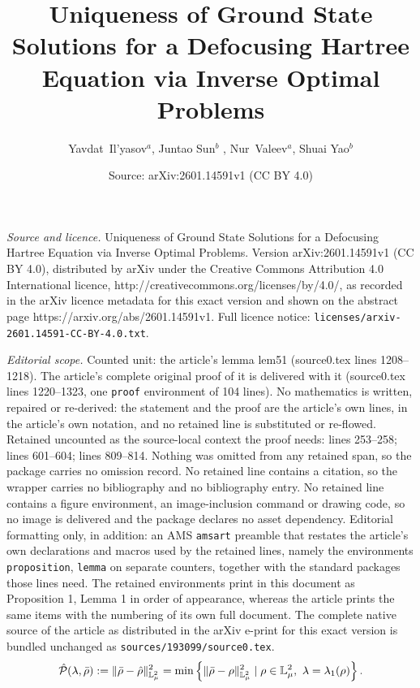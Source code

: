 \documentclass[10pt,a4paper]{amsart}
\title{Uniqueness of Ground State Solutions for a Defocusing Hartree Equation via Inverse Optimal Problems}
\author{Yavdat~Il'yasov$^{a}$, Juntao Sun$^{b}$ , Nur~Valeev$^{a}$, Shuai Yao$^{b}$}
\date{Source: arXiv:2601.14591v1 (CC BY 4.0)}
\begin{document}
\maketitle

\noindent\emph{Source and licence.} Uniqueness of Ground State Solutions for a Defocusing Hartree Equation via Inverse Optimal Problems. Version arXiv:2601.14591v1 (CC BY 4.0), distributed by arXiv under the Creative Commons Attribution 4.0 International licence, http://creativecommons.org/licenses/by/4.0/, as recorded in the arXiv licence metadata for this exact version and shown on the abstract page https://arxiv.org/abs/2601.14591v1. Full licence notice: \texttt{licenses/arxiv-2601.14591-CC-BY-4.0.txt}.\par\smallskip

\noindent\textit{Editorial scope.} Counted unit: the article's lemma lem51 (source0.tex lines 1208--1218). The article's complete original proof of it is delivered with it (source0.tex lines 1220--1323, one \texttt{proof} environment of 104 lines). No mathematics is written, repaired or re-derived: the statement and the proof are the article's own lines, in the article's own notation, and no retained line is substituted or re-flowed.  Retained uncounted as the source-local context the proof needs: lines 253--258; lines 601--604; lines 809--814.  Nothing was omitted from any retained span, so the package carries no omission record.  No retained line contains a citation, so the wrapper carries no bibliography and no bibliography entry.  No retained line contains a figure environment, an image-inclusion command or drawing code, so no image is delivered and the package declares no asset dependency.  Editorial formatting only, in addition: an AMS \texttt{amsart} preamble that restates the article's own declarations and macros used by the retained lines, namely the environments \texttt{proposition}, \texttt{lemma} on separate counters, together with the standard packages those lines need.  The retained environments print in this document as Proposition 1, Lemma 1 in order of appearance, whereas the article prints the same items with the numbering of its own full document.  The complete native source of the article as distributed in the arXiv e-print for this exact version is bundled unchanged as \texttt{sources/193099/source0.tex}.
\begin{equation}
\hat{\mathcal{P}}(\lambda ,\bar{\rho}):=\Vert \bar{\rho}-\hat{\rho}\Vert _{%
\mathbb{L}_{\mu }^{2}}^{2}=\min \left\{ \Vert \bar{\rho}-\rho \Vert _{%
\mathbb{L}_{\mu }^{2}}^{2}\mid \rho \in \mathbb{L}_{\mu }^{2},\ \lambda
=\lambda _{1}(\rho )\right\} .  \label{eq:p}
\end{equation}%
\end{document}
